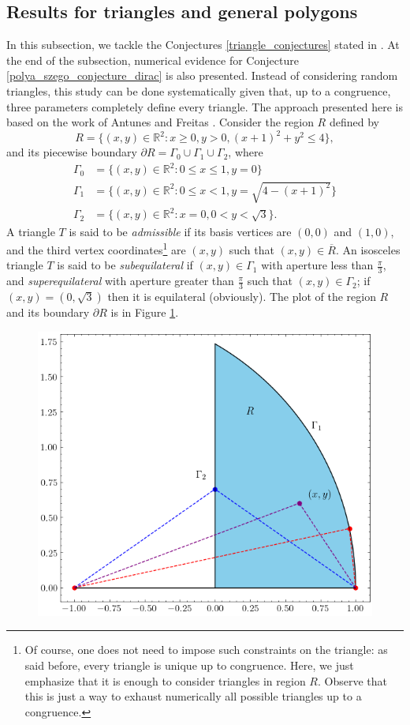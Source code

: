 \subsection{Results for triangles and general polygons}\label{chap_numerics_dirac_triangles_section}

In this subsection, we tackle the Conjectures \ref{triangle_conjectures} stated in \cite{vu2023spectral}. At the end of the subsection, numerical evidence for Conjecture \ref{polya_szego_conjecture_dirac} is also presented. Instead of considering random triangles, this study can be done systematically given that, up to a congruence, three parameters completely define every triangle. The approach presented here is based on the work of Antunes and Freitas \cite{antunes2011inverse}. Consider the region \(R\) defined by
\[
    R = \{(x, y) \in \mathbb{R}^2: x \geq 0, y > 0, (x+1)^2 + y^2 \leq 4\},
\]
and its piecewise boundary \(\partial R = \Gamma_0 \cup \Gamma_1 \cup \Gamma_2\), where
\begin{align*}
    \Gamma_0 &= \{(x,y) \in \mathbb{R}^2: 0 \leq x \leq 1, y=0\}\\
    \Gamma_1 &= \{(x,y) \in \mathbb{R}^2: 0 \leq x < 1, y=\sqrt{4-(x+1)^2}\}\\
    \Gamma_2 &= \{(x,y) \in \mathbb{R}^2: x=0, 0 < y < \sqrt{3}\}.
\end{align*}
A triangle \(T\) is said to be \textit{admissible} if its basis vertices are \((0, 0)\) and \((1, 0)\), and the third vertex coordinates\footnote{Of course, one does not need to impose such constraints on the triangle: as said before, every triangle is unique up to congruence. Here, we just emphasize that it is enough to consider triangles in region \(R\). Observe that this is just a way to exhaust numerically all possible triangles up to a congruence.} are \((x,y)\) such that \((x,y) \in \overline{R}\). An isosceles triangle \(T\) is said to be \textit{subequilateral} if \((x, y) \in \Gamma_1\) with aperture less
than \(\frac{\pi}{3}\), and \textit{superequilateral} with aperture greater
than \(\frac{\pi}{3}\) such that \((x, y) \in \Gamma_2\); if \((x, y) = (0, \sqrt{3})\) then it is equilateral (obviously). The plot of the region \(R\) and its boundary \(\partial R\) is in Figure \ref{dirac_triangle_model}.

\begin{figure}[!htb]
    \centering
    \includegraphics[width=0.5\linewidth]{Images/Dirac/model_triangle.png}
    \label{dirac_triangle_model}
\end{figure}


